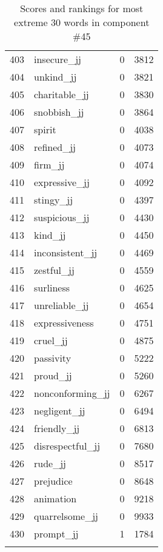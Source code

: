 \begin{longtable}[!htbp]{| rlr@{.}l |}
    403 & insecure\_jj & 0 & 3812 \\
    404 & unkind\_jj & 0 & 3821 \\
    405 & charitable\_jj & 0 & 3830 \\
    406 & snobbish\_jj & 0 & 3864 \\
    407 & spirit & 0 & 4038 \\
    408 & refined\_jj & 0 & 4073 \\
    409 & firm\_jj & 0 & 4074 \\
    410 & expressive\_jj & 0 & 4092 \\
    411 & stingy\_jj & 0 & 4397 \\
    412 & suspicious\_jj & 0 & 4430 \\
    413 & kind\_jj & 0 & 4450 \\
    414 & inconsistent\_jj & 0 & 4469 \\
    415 & zestful\_jj & 0 & 4559 \\
    416 & surliness & 0 & 4625 \\
    417 & unreliable\_jj & 0 & 4654 \\
    418 & expressiveness & 0 & 4751 \\
    419 & cruel\_jj & 0 & 4875 \\
    420 & passivity & 0 & 5222 \\
    421 & proud\_jj & 0 & 5260 \\
    422 & nonconforming\_jj & 0 & 6267 \\
    423 & negligent\_jj & 0 & 6494 \\
    424 & friendly\_jj & 0 & 6813 \\
    425 & disrespectful\_jj & 0 & 7680 \\
    426 & rude\_jj & 0 & 8517 \\
    427 & prejudice & 0 & 8648 \\
    428 & animation & 0 & 9218 \\
    429 & quarrelsome\_jj & 0 & 9933 \\
    430 & prompt\_jj & 1 & 1784 \\
    \hline
    \caption{Scores and rankings for most extreme 30 words in component \#45} \\
\end{longtable}
